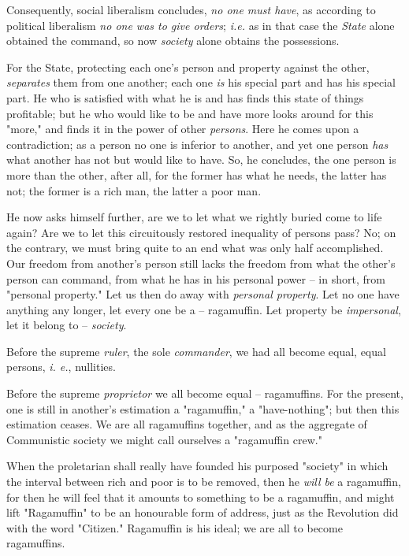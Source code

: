 \documentclass[a4paper]{book}
\begin{document}
Consequently, social liberalism concludes, \textit{no one must have}, as 
according to political liberalism \textit{no one was to give orders}; 
\textit{i.e.} as in that case the \textit{State} alone obtained the command, 
so now \textit{society} alone obtains the possessions.

For the State, protecting each one's person and property against the other, 
\textit{separates} them from one another; each one \textit{is} his special 
part and has his special part. He who is satisfied with what he is and has 
finds this state of things profitable; but he who would like to be and have 
more looks around for this "{}more,"{} and finds it in the power of other 
\textit{persons}. Here he comes upon a contradiction; as a person no one is 
inferior to another, and yet one person \textit{has} what another has not but 
would like to have. So, he concludes, the one person is more than the other, 
after all, for the former has what he needs, the latter has not; the former is 
a rich man, the latter a poor man.

He now asks himself further, are we to let what we rightly buried come to life 
again? Are we to let this circuitously restored inequality of persons pass? 
No; on the contrary, we must bring quite to an end what was only half 
accomplished. Our freedom from another's person still lacks the freedom from 
what the other's person can command, from what he has in his personal power -- 
in short, from "{}personal property."{} Let us then do away with 
\textit{personal property}. Let no one have anything any longer, let every one 
be a -- ragamuffin. Let property be \textit{impersonal}, let it belong to -- 
\textit{society}.

Before the supreme \textit{ruler}, the sole \textit{commander}, we had all 
become equal, equal persons, \textit{i. e.}, nullities.

Before the supreme \textit{proprietor} we all become equal -- ragamuffins. For 
the present, one is still in another's estimation a "{}ragamuffin,"{} a 
"{}have-nothing"{}; but then this estimation ceases. We are all ragamuffins 
together, and as the aggregate of Communistic society we might call ourselves 
a "{}ragamuffin crew."{}

When the proletarian shall really have founded his purposed "{}society"{} in 
which the interval between rich and poor is to be removed, then he 
\textit{will be} a ragamuffin, for then he will feel that it amounts to 
something to be a ragamuffin, and might lift "{}Ragamuffin"{} to be an 
honourable form of address, just as the Revolution did with the word 
"{}Citizen."{} Ragamuffin is his ideal; we are all to become ragamuffins.
\end{document}
